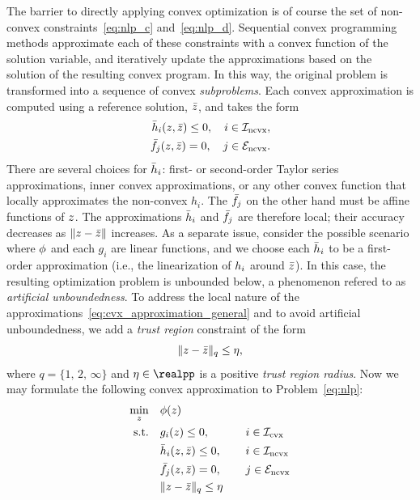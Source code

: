 \documentclass[letterpaper, 10 pt, conference]{ieeeconf}
\begin{document}
The barrier to directly applying convex optimization is of course the set of non-convex constraints~\eqref{eq:nlp_c} and~\eqref{eq:nlp_d}. Sequential convex programming methods approximate each of these constraints with a convex function of the solution variable, and iteratively update the approximations based on the solution of the resulting convex program. In this way, the original problem is transformed into a sequence of convex \textit{subproblems}. Each convex approximation is computed using a reference solution, $\bar{z}$, and takes the form
\begin{subequations}\label{eq:cvx_approximation_general}
\begin{align}
\bar{h}_i(z,\bar{z}) \leq 0, \quad i\in\mathcal{I}_{\text{ncvx}}, \label{eq:cvx_approximation_general_ineq} \\
\bar{f}_j(z,\bar{z}) = 0, \quad j\in\mathcal{E}_{\text{ncvx}}. \label{eq:cvx_approximation_general_eq}
\end{align}
\end{subequations}
There are several choices for $\bar{h}_i$: first- or second-order Taylor series approximations, inner convex approximations, or any other convex function that locally approximates the non-convex $h_i$. The $\bar{f}_j$ on the other hand must be affine functions of $z$. The approximations $\bar{h}_i$ and $\bar{f}_j$ are therefore local; their accuracy decreases as $\|z-\bar{z}\|$ increases. As a separate issue, consider the possible scenario where $\phi$ and each $g_i$ are linear functions, and we choose each $\bar{h}_i$ to be a first-order approximation (i.e., the linearization of $h_i$ around $\bar{z}$). In this case, the resulting optimization problem is unbounded below, a phenomenon refered to as \textit{artificial unboundedness}. To address the local nature of the approximations~\eqref{eq:cvx_approximation_general} and to avoid artificial unboundedness, we add a \textit{trust region} constraint of the form
\begin{equation}
\| z - \bar{z} \|_q \leq \eta,
\label{eq:trust_region}
\end{equation}
where $q=\{1,\,2,\,\infty\}$ and $\tr\in\realpp$ is a positive \textit{trust region radius}. Now we may formulate the following convex approximation to Problem~\eqref{eq:nlp}:
\begin{subequations}\label{eq:cvx_tr}
\begin{align}
\min_z &\quad \ocost(\z) &&\null \label{eq:cvx_tr_a} \\
\text{s.t.} &\quad \fc_i(\z) \leq 0, &&\quad i\in\setIcvx \label{eq:cvx_tr_b} \\
&\quad \fnib_i(\z,\zb) \leq 0, &&\quad i\in\setIncvx \label{eq:cvx_tr_c}\\
&\quad \fneb_j(\z,\zb) = 0, &&\quad j\in\setEncvx \label{eq:cvx_tr_d} \\
&\quad \| \z - \zb \|_q \leq \tr  &&\null \label{eq:cvx_tr_e}
\end{align}
\end{subequations}
\end{document}

